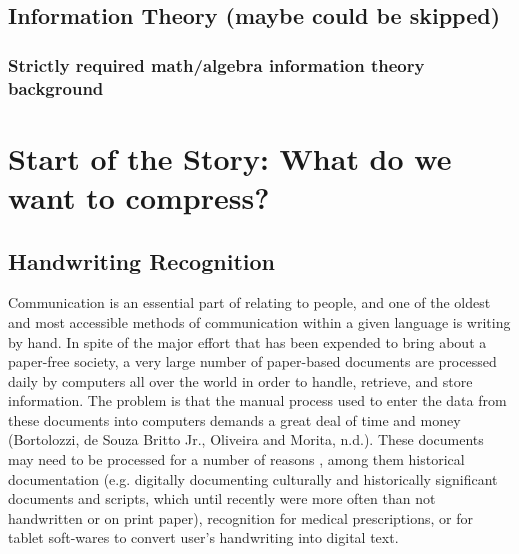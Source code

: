 \documentclass[12pt]{report}
\begin{document}
            
        
        \section{Information Theory (maybe could be skipped)}
        \subsection{Strictly required math/algebra information theory background}
    
    \chapter{Start of the Story: What do we want to compress?}
        \section{Handwriting Recognition}
            Communication is an essential part of relating to people, and one of the oldest and most accessible methods of communication within a given language is writing by hand. In spite of the major effort that has been expended to bring about a paper-free society, a very large number of paper-based documents are processed daily by computers all over the world in order to handle, retrieve, and store information. The problem is that the manual process used to enter the data from these documents into computers demands a great deal of time and money (Bortolozzi, de Souza Britto Jr., Oliveira and Morita, n.d.). These documents may need to be processed for a number of reasons , among them historical documentation (e.g. digitally documenting culturally and historically significant documents and scripts, which until recently were more often than not handwritten or on print paper), recognition for medical prescriptions, or for tablet  soft-wares to convert user's handwriting into digital text.
        
\end{document}
